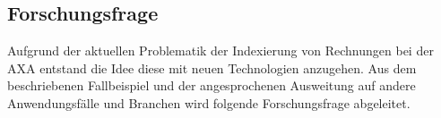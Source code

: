 \documentclass{hwz}
\begin{document}

%
%
%
%
%
%
%
%

\subsection{Forschungsfrage}

Aufgrund der aktuellen Problematik der Indexierung von Rechnungen bei der AXA entstand die Idee diese mit neuen Technologien anzugehen. Aus dem beschriebenen Fallbeispiel und der angesprochenen Ausweitung auf andere Anwendungsfälle und Branchen wird folgende Forschungsfrage abgeleitet.\newline\newline
{
    \medskip
    \setlength{\fboxsep}{1em}
    \noindent{}
    \medskip
}



\end{document}
